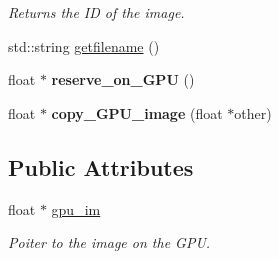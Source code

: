 \begin{DoxyCompactItemize}
\begin{DoxyCompactList}\small\item\em Returns the ID of the image. \end{DoxyCompactList}\item 
std\+::string \hyperlink{classImage__cuda__compatible_a6588dcbebccad868403cdd7993cc9f76}{getfilename} ()
\item 
float $\ast$ {\bfseries reserve\+\_\+on\+\_\+\+G\+PU} ()\hypertarget{classImage__cuda__compatible_a9ecba044299f4ced3d44dd9703b52311}{}\label{classImage__cuda__compatible_a9ecba044299f4ced3d44dd9703b52311}

\item 
float $\ast$ {\bfseries copy\+\_\+\+G\+P\+U\+\_\+image} (float $\ast$other)\hypertarget{classImage__cuda__compatible_a4f8384e40c0f012cee04da87d2c43c18}{}\label{classImage__cuda__compatible_a4f8384e40c0f012cee04da87d2c43c18}

\end{DoxyCompactItemize}
\subsection*{Public Attributes}
\begin{DoxyCompactItemize}
\item 
float $\ast$ \hyperlink{classImage__cuda__compatible_aecdcb6343d0b536bae6da90de8d3bc4f}{gpu\+\_\+im}\hypertarget{classImage__cuda__compatible_aecdcb6343d0b536bae6da90de8d3bc4f}{}\label{classImage__cuda__compatible_aecdcb6343d0b536bae6da90de8d3bc4f}

\begin{DoxyCompactList}\small\item\em Poiter to the image on the G\+PU. \end{DoxyCompactList}\end{DoxyCompactItemize}
